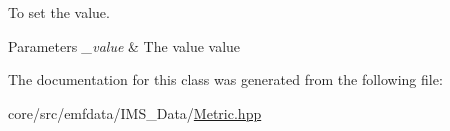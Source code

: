 To set the value. 


\begin{DoxyParams}{Parameters}
{\em \_\-value} & The value value \\
\hline
\end{DoxyParams}


The documentation for this class was generated from the following file:\begin{DoxyCompactItemize}
\item 
core/src/emfdata/IMS\_\-Data/\hyperlink{Metric_8hpp}{Metric.hpp}\end{DoxyCompactItemize}
